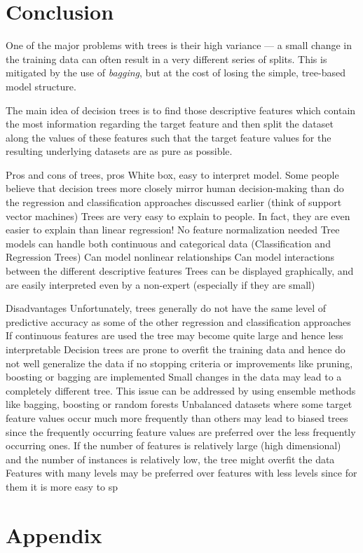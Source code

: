 \documentclass[10pt, a4paper, twocolumn]{article}
\begin{document}
\section{Conclusion}
	One of the major problems with trees is their high variance --- a small change in the training data can often result in a very different series of splits. This is mitigated by the use of \emph{bagging}, but at the cost of losing the simple, tree-based model structure.
	
	The main idea of decision trees is to find those descriptive features which contain the most information regarding the target feature and then split the dataset along the values of these features such that the target feature values for the resulting underlying datasets are as pure as possible.
	
	
	Pros and cons of trees, pros
	White box, easy to interpret model. Some people believe that decision trees more closely mirror human decision-making than do the regression and classification approaches discussed earlier (think of support vector machines)
	Trees are very easy to explain to people. In fact, they are even easier to explain than linear regression!
	No feature normalization needed
	Tree models can handle both continuous and categorical data (Classification and Regression Trees)
	Can model nonlinear relationships
	Can model interactions between the different descriptive features
	Trees can be displayed graphically, and are easily interpreted even by a non-expert (especially if they are small)
	
	Disadvantages
	Unfortunately, trees generally do not have the same level of predictive accuracy as some of the other regression and classification approaches
	If continuous features are used the tree may become quite large and hence less interpretable
	Decision trees are prone to overfit the training data and hence do not well generalize the data if no stopping criteria or improvements like pruning, boosting or bagging are implemented
	Small changes in the data may lead to a completely different tree. This issue can be addressed by using ensemble methods like bagging, boosting or random forests
	Unbalanced datasets where some target feature values occur much more frequently than others may lead to biased trees since the frequently occurring feature values are preferred over the less frequently occurring ones.
	If the number of features is relatively large (high dimensional) and the number of instances is relatively low, the tree might overfit the data
	Features with many levels may be preferred over features with less levels since for them it is more easy to sp
	
\onecolumn
\section{Appendix}
	
\twocolumn
	
\nocite{*}


\end{document}
